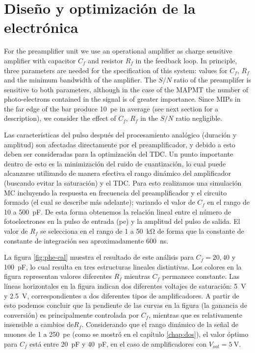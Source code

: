 \section{Diseño y optimización de la electrónica}



For the preamplifier unit we use an operational amplifier as charge sensitive amplifier with capacitor $C_{f}$ and resistor $R_{f}$ in the feedback loop. In principle, three parameters are needed for the specification of this system: values for $C_{f}$, $R_{f}$ and the minimum bandwidth of the amplifier. The $S/N$ ratio of the preamplifer is sensitive to both parameters, although in the case of the MAPMT the number of photo-electrons contained in the signal is of greater importance. Since MIPs in the far edge of the bar produce  \SI{10}{pe} in average (see next section for a description), we consider the effect of $C_{f}$, $R_{f}$ in the $S/N$ ratio negligible.

Las características del pulso después del procesamiento analógico (duración y amplitud) son afectadas directamente por el preamplificador, y debido a esto deben ser consideradas para la optimización del TDC. Un punto importante dentro de esto es la minimización del ruido de cuantización, lo cual puede alcanzarse utilizando de manera efectiva el rango dinámico del amplificador (buscando evitar la saturación) y el TDC. Para esto realizamos una simulación MC incluyendo la respuesta en frecuencia del preamplificador y el circuito formado (el cual se describe más adelante); variando el valor de $C_{f}$ en el rango de \num{10} a \SI{500}{\pico\farad}. De esta forma obtenemos la relación lineal entre el número de fotoelectrones en la pulso de entrada (\si{pe}) y la amplitud del pulso de salida. El valor de $R_{f}$ se selecciona en el rango de \num{1} a \SI{50}{\kilo\ohm} de forma que la constante de constante de integración sea aproximadamente \SI{600}{\ns}.

La figura \ref{fig:phe-cal} muestra el resultado de este análisis para $C_ {f}=20,40$ y \SI{100}{\pico\farad}, lo cual resulta en tres estructuras lineales distintivas. Los colores en la figura representan valores diferentes $R_{f}$ mientras $C_{f}$ permanece constante. Las líneas horizontales en la figura indican dos diferentes voltajes de saturación: \SI{5}{\volt} y \SI{2.5}{\volt}, correspondientes a dos diferentes tipos de amplificadores. A partir de esto podemos concluir que la pendiente de las curvas en la figura (la ganancia de conversión) es principalmente controlada por $C_{f}$, mientras que es relativamente insensible a cambios de$R_{f}$. Considerando que el rango dinámico de la señal de muones de \num{1} a \SI{250}{pe} (como se mostró en el capítulo \ref{chap:dos}), el valor óptimo para $C_{f}$ está entre \SI{20}{\pico\farad} y \SI{40}{\pico\farad}, en el caso de amplificadores con $V_{sat}=\SI{5}{\volt}$.

